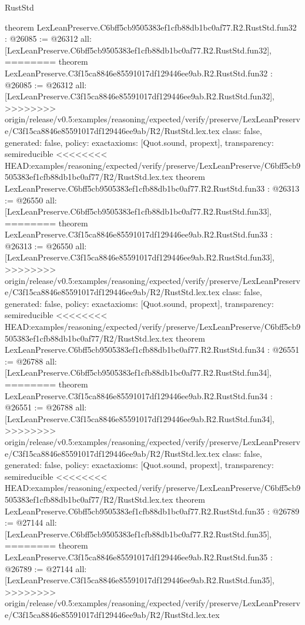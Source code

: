 \begin{lexlean}{RustStd}
\begin{coremodule}
{\begin{coremodule}
{{{{{{{{{{{{{{{{{{{{{{{{{{{{{{{{{{theorem LexLeanPreserve.C6bff5cb9505383ef1cfb88db1bc0af77.R2.RustStd.fun32 : @26085 := @26312 {
  all: [LexLeanPreserve.C6bff5cb9505383ef1cfb88db1bc0af77.R2.RustStd.fun32],
========
theorem LexLeanPreserve.C3f15ca8846e85591017df129446ee9ab.R2.RustStd.fun32 : @26085 := @26312 {
  all: [LexLeanPreserve.C3f15ca8846e85591017df129446ee9ab.R2.RustStd.fun32],
>>>>>>>> origin/release/v0.5:examples/reasoning/expected/verify/preserve/LexLeanPreserve/C3f15ca8846e85591017df129446ee9ab/R2/RustStd.lex.tex
  class: false,
  generated: false,
  policy: exact{axioms: [Quot.sound, propext]},
  transparency: semireducible
}
<<<<<<<< HEAD:examples/reasoning/expected/verify/preserve/LexLeanPreserve/C6bff5cb9505383ef1cfb88db1bc0af77/R2/RustStd.lex.tex
theorem LexLeanPreserve.C6bff5cb9505383ef1cfb88db1bc0af77.R2.RustStd.fun33 : @26313 := @26550 {
  all: [LexLeanPreserve.C6bff5cb9505383ef1cfb88db1bc0af77.R2.RustStd.fun33],
========
theorem LexLeanPreserve.C3f15ca8846e85591017df129446ee9ab.R2.RustStd.fun33 : @26313 := @26550 {
  all: [LexLeanPreserve.C3f15ca8846e85591017df129446ee9ab.R2.RustStd.fun33],
>>>>>>>> origin/release/v0.5:examples/reasoning/expected/verify/preserve/LexLeanPreserve/C3f15ca8846e85591017df129446ee9ab/R2/RustStd.lex.tex
  class: false,
  generated: false,
  policy: exact{axioms: [Quot.sound, propext]},
  transparency: semireducible
}
<<<<<<<< HEAD:examples/reasoning/expected/verify/preserve/LexLeanPreserve/C6bff5cb9505383ef1cfb88db1bc0af77/R2/RustStd.lex.tex
theorem LexLeanPreserve.C6bff5cb9505383ef1cfb88db1bc0af77.R2.RustStd.fun34 : @26551 := @26788 {
  all: [LexLeanPreserve.C6bff5cb9505383ef1cfb88db1bc0af77.R2.RustStd.fun34],
========
theorem LexLeanPreserve.C3f15ca8846e85591017df129446ee9ab.R2.RustStd.fun34 : @26551 := @26788 {
  all: [LexLeanPreserve.C3f15ca8846e85591017df129446ee9ab.R2.RustStd.fun34],
>>>>>>>> origin/release/v0.5:examples/reasoning/expected/verify/preserve/LexLeanPreserve/C3f15ca8846e85591017df129446ee9ab/R2/RustStd.lex.tex
  class: false,
  generated: false,
  policy: exact{axioms: [Quot.sound, propext]},
  transparency: semireducible
}
<<<<<<<< HEAD:examples/reasoning/expected/verify/preserve/LexLeanPreserve/C6bff5cb9505383ef1cfb88db1bc0af77/R2/RustStd.lex.tex
theorem LexLeanPreserve.C6bff5cb9505383ef1cfb88db1bc0af77.R2.RustStd.fun35 : @26789 := @27144 {
  all: [LexLeanPreserve.C6bff5cb9505383ef1cfb88db1bc0af77.R2.RustStd.fun35],
========
theorem LexLeanPreserve.C3f15ca8846e85591017df129446ee9ab.R2.RustStd.fun35 : @26789 := @27144 {
  all: [LexLeanPreserve.C3f15ca8846e85591017df129446ee9ab.R2.RustStd.fun35],
>>>>>>>> origin/release/v0.5:examples/reasoning/expected/verify/preserve/LexLeanPreserve/C3f15ca8846e85591017df129446ee9ab/R2/RustStd.lex.tex
}}}}}}}}}}}}}}}}}}}}}}}}}}}}}}}}}}}}}}}
\end{coremodule}}
\end{coremodule}
\end{lexlean}
